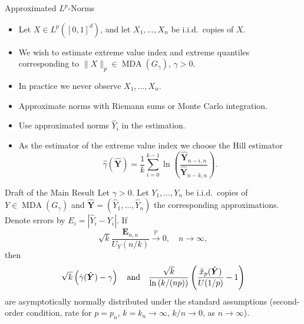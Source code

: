 \documentclass[11pt, aspectratio=169]{beamer}
\DeclareMathOperator{\mda}{MDA}
\begin{document}
\begin{frame}{Approximated $L^p$-Norms}
  \begin{itemize}
    \item Let $X\in L^p\left([0, 1]^d\right)$, and let $X_1,\ldots, X_n$ be
    i.i.d.\ copies of $X$.
    \item We wish to estimate extreme value index and extreme quantiles
    corresponding to $\|X\|_p\in\mda\left(G_\gamma\right)$, $\gamma > 0$.
    \pause
    \item In practice we never observe $X_1, \ldots, X_n$.
    \pause
    \item Approximate norms with Riemann sums or Monte Carlo integration.
    \item Use approximated norms $\hat{Y}_i$ in the estimation.
    \pause
    \item As the estimator of the extreme value index we choose the Hill
    estimator
    \begin{equation*}
      \hat\gamma(\hat{\bm Y}) = \frac{1}{k}\sum_{i = 0}^{k-1}
      \ln\left(\frac{\hat{\bm Y}_{n-i,n}}{\hat{\bm Y}_{n-k,n}}\right).
    \end{equation*}
  \end{itemize}
\end{frame}


\begin{frame}{Draft of the Main Result}
  Let $\gamma > 0$. Let $Y_1, \ldots, Y_n$ be i.i.d.\ copies of
  $Y\in\mda\left(G_\gamma\right)$ and $\hat{\bm Y} = (\hat Y_1, \ldots, \hat
  Y_n)$ the corresponding approximations. Denote errors by $E_i = \left|\hat Y_i
  - Y_i\right|$. If
  \begin{equation*}
    \sqrt{k}\frac{\bm E_{n,n}}{U_Y\left(n/k\right)}\stackrel{\mathbb{P}}{\to}0,
    \quad n\to\infty,
  \end{equation*}
  then
  \begin{equation*}
    \sqrt{k}\left(\hat\gamma(\hat{\bm Y}) - \gamma\right)
    \quad\textnormal{and}\quad
    \frac{\sqrt{k}}{\ln\left(k/(np)\right)}\left(\frac{\hat x_p(\hat{\bm Y})}
    {U(1/p)} - 1\right)
  \end{equation*}
  are asymptotically normally distributed under the standard assumptions
  (second-order condition, rate for $p = p_n$, $k = k_n\to\infty$, $k/n\to 0$,
  as $n\to\infty$). 
\end{frame}

\end{document}

